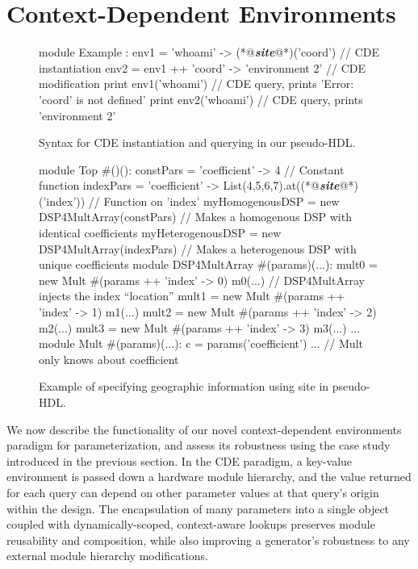 \section{Context-Dependent Environments}
\label{sec:cde}

\begin{figure}
\centering
\begin{phdl}
module Example :
  env1 = {'whoami' -> (*@\textcolor[rgb]{1,0.5,0}{\textbf{\textit{site}}}@*)('coord')} // CDE instantiation
  env2 = env1 ++ {'coord' -> 'environment 2'} // CDE modification
  print env1('whoami')                        // CDE query, prints 'Error: 'coord' is not defined'
  print env2('whoami')                        // CDE query, prints 'environment 2'
\end{phdl}
\caption{Syntax for CDE instantiation and querying in our pseudo-HDL.}
\label{fig:cde-phdl}
\end{figure}

\begin{figure}
\centering
\begin{phdl}
module Top #()():
  constPars = { 'coefficient' -> 4 }                                      // Constant function
  indexPars = { 'coefficient' -> List(4,5,6,7).at((*@\textcolor[rgb]{1,0.5,0}{\textbf{\textit{site}}}@*)('index')) } // Function on 'index'
  myHomogenousDSP   = new DSP4MultArray(constPars)     // Makes a homogenous DSP with identical coefficients
  myHeterogenousDSP = new DSP4MultArray(indexPars)     // Makes a heterogenous DSP with unique coefficients
module DSP4MultArray #(params)(...):
  mult0 = new Mult #(params ++ {'index' -> 0}) m0(...) // DSP4MultArray injects the index ``location''
  mult1 = new Mult #(params ++ {'index' -> 1}) m1(...)
  mult2 = new Mult #(params ++ {'index' -> 2}) m2(...)
  mult3 = new Mult #(params ++ {'index' -> 3}) m3(...) ...
module Mult #(params)(...):
  c = params('coefficient') ...                        // Mult only knows about coefficient
\end{phdl}
\caption{Example of specifying geographic information using site in pseudo-HDL.}
\label{fig:site-phdl}
\end{figure}

We now describe the functionality of our novel context-dependent environments paradigm for parameterization,
and assess its robustness using the case study introduced in the previous section.
In the CDE paradigm, a key-value environment is passed down a hardware module hierarchy, and the value returned for each query can depend on other parameter values at that query's origin within the design.
The encapsulation of many parameters into a single object coupled with dynamically-scoped, context-aware lookups preserves module reusability and composition, while also improving a generator's robustness to any external module hierarchy modifications.

